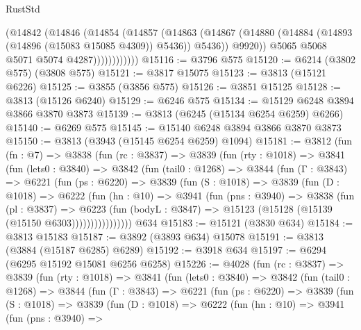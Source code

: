 \begin{lexlean}{RustStd}
\begin{coremodule}
                      (@14842
                        (@14846
                          (@14854
                            (@14857
                              (@14863
                                (@14867
                                  (@14880
                                    (@14884 (@14893 (@14896 (@15083 @15085 @4309)) @5436))
                                    @5436))
                                @9920))
                            @5065
                            @5068
                            @5071
                            @5074
                            @4287))))))))))))
@15116 := @3796 @575
@15120 := @6214 (@3802 @575) (@3808 @575)
@15121 := @3817 @15075
@15123 := @3813 (@15121 @6226)
@15125 := @3855 (@3856 @575)
@15126 := @3851 @15125
@15128 := @3813 (@15126 @6240)
@15129 := @6246 @575
@15134 := @15129 @6248 @3894 @3866 @3870 @3873
@15139 := @3813 (@6245 (@15134 @6254 @6259) @6266)
@15140 := @6269 @575
@15145 := @15140 @6248 @3894 @3866 @3870 @3873
@15150 := @3813 (@3943 (@15145 @6254 @6259) @1094)
@15181 := @3812
    (fun (fn : @7) =>
    @3838
      (fun (rc : @3837) =>
      @3839
        (fun (rty : @1018) =>
        @3841
          (fun (lets0 : @3840) =>
          @3842
            (fun (tail0 : @1268) =>
            @3844
              (fun (Γ : @3843) =>
              @6221
                (fun (ps : @6220) =>
                @3839
                  (fun (S : @1018) =>
                  @3839
                    (fun (D : @1018) =>
                    @6222
                      (fun (hn : @10) =>
                      @3941
                        (fun (pns : @3940) =>
                        @3838
                          (fun (pl : @3837) =>
                          @6223
                            (fun (bodyL : @3847) =>
                            @15123 (@15128 (@15139 (@15150 @6303))))))))))))))))
    @634
@15183 := @15121 (@3830 @634)
@15184 := @3813 @15183
@15187 := @3892 (@3893 @634) @15078
@15191 := @3813 (@3884 (@15187 @6285) @6289)
@15192 := @3918 @634
@15197 := @6294 (@6295 @15192 @15081 @6256 @6258)
@15226 := @4028
    (fun (rc : @3837) =>
    @3839
      (fun (rty : @1018) =>
      @3841
        (fun (lets0 : @3840) =>
        @3842
          (fun (tail0 : @1268) =>
          @3844
            (fun (Γ : @3843) =>
            @6221
              (fun (ps : @6220) =>
              @3839
                (fun (S : @1018) =>
                @3839
                  (fun (D : @1018) =>
                  @6222
                    (fun (hn : @10) =>
                    @3941
                      (fun (pns : @3940) =>

\end{coremodule}
\end{lexlean}
